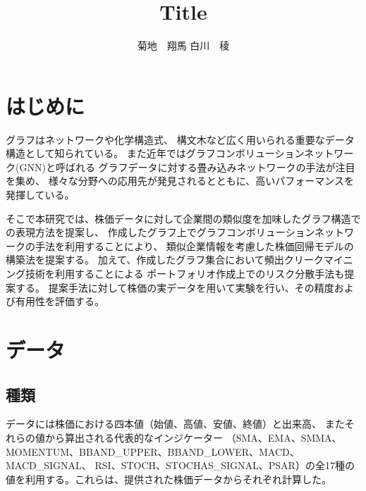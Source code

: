\documentclass[twocolumn,10.5pt]{article}           %
\begin{document}
\title{Title}
\author{菊地　翔馬 \hspace{180pt} 白川　稜}

\date{}
\maketitle


\section{はじめに}
グラフはネットワークや化学構造式、
構文木など広く用いられる重要なデータ構造として知られている。
また近年ではグラフコンボリューションネットワーク(GNN)と呼ばれる
グラフデータに対する畳み込みネットワークの手法が注目を集め、
様々な分野への応用先が発見されるとともに、高いパフォーマンスを発揮している。

そこで本研究では、株価データに対して企業間の類似度を加味したグラフ構造での表現方法を提案し、
作成したグラフ上でグラフコンボリューションネットワークの手法を利用することにより、
類似企業情報を考慮した株価回帰モデルの構築法を提案する。
加えて、作成したグラフ集合において頻出クリークマイニング技術を利用することによる
ポートフォリオ作成上でのリスク分散手法も提案する。
提案手法に対して株価の実データを用いて実験を行い、その精度および有用性を評価する。

\section{データ}
\subsection{種類}
データには株価における四本値（始値、高値、安値、終値）と出来高、
またそれらの値から算出される代表的なインジケーター
（SMA、EMA、SMMA、MOMENTUM、BBAND\_UPPER、BBAND\_LOWER、MACD、MACD\_SIGNAL、
RSI、STOCH、STOCHAS\_SIGNAL、PSAR）の全17種の値を利用する。これらは、提供された株価データからそれぞれ計算した。
\end{document}
